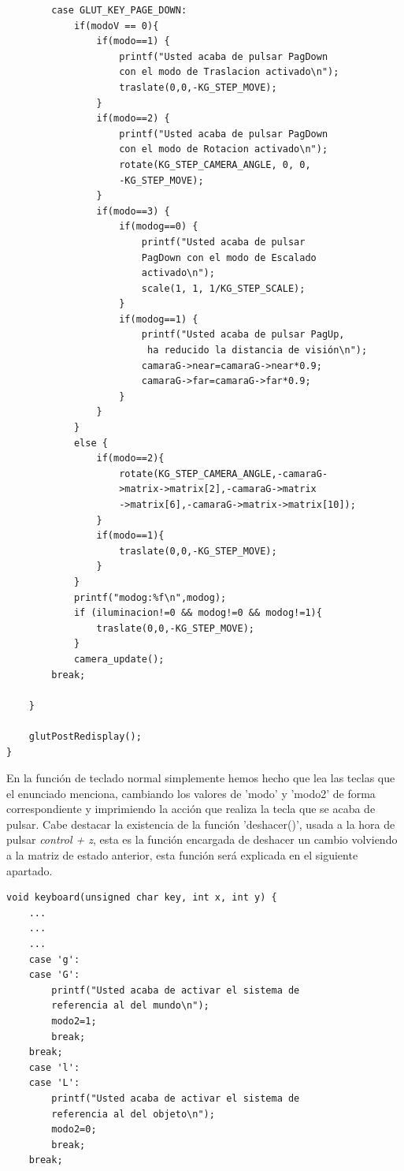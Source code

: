 \documentclass[12pt,a4paper]{article}
\begin{document}
\begin{enumerate}
\begin{lstlisting}
        case GLUT_KEY_PAGE_DOWN:
        	if(modoV == 0){
        		if(modo==1) {
                    printf("Usted acaba de pulsar PagDown
                    con el modo de Traslacion activado\n");
                    traslate(0,0,-KG_STEP_MOVE);
                }
               	if(modo==2) {
                    printf("Usted acaba de pulsar PagDown
                    con el modo de Rotacion activado\n");
                    rotate(KG_STEP_CAMERA_ANGLE, 0, 0, 
                    -KG_STEP_MOVE);
                }
                if(modo==3) {
                	if(modog==0) {
                    	printf("Usted acaba de pulsar
                    	PagDown con el modo de Escalado
                    	activado\n");
                    	scale(1, 1, 1/KG_STEP_SCALE);
                	}
                	if(modog==1) {
                		printf("Usted acaba de pulsar PagUp,
                		 ha reducido la distancia de visión\n");
                		camaraG->near=camaraG->near*0.9;
                		camaraG->far=camaraG->far*0.9;
                	}
                }
            }
            else {
            	if(modo==2){
             		rotate(KG_STEP_CAMERA_ANGLE,-camaraG-
             		>matrix->matrix[2],-camaraG->matrix
             		->matrix[6],-camaraG->matrix->matrix[10]);
             	}
             	if(modo==1){
             		traslate(0,0,-KG_STEP_MOVE);
             	}
            }
            printf("modog:%f\n",modog);
            if (iluminacion!=0 && modog!=0 && modog!=1){
        		traslate(0,0,-KG_STEP_MOVE);
        	}
            camera_update();
        break;
        
    }
    
    glutPostRedisplay();
}

\end{lstlisting}

En la función de teclado normal simplemente hemos hecho que lea las teclas que el enunciado menciona, cambiando los valores de 'modo' y 'modo2' de forma correspondiente y imprimiendo la acción que realiza la tecla que se acaba de pulsar.\newline
Cabe destacar la existencia de la función 'deshacer()', usada a la hora de pulsar \textit{control + z}, esta es la función encargada de deshacer un cambio volviendo a la matriz de estado anterior, esta función será explicada en el siguiente apartado.

\begin{lstlisting}
void keyboard(unsigned char key, int x, int y) {
    ...
    ...
    ...
    case 'g':
    case 'G':
        printf("Usted acaba de activar el sistema de 
        referencia al del mundo\n");
        modo2=1;
        break;
    break;
    case 'l':
    case 'L':
        printf("Usted acaba de activar el sistema de 
        referencia al del objeto\n");
        modo2=0;
        break;
    break;


\end{lstlisting}
\end{enumerate}
\end{document}
